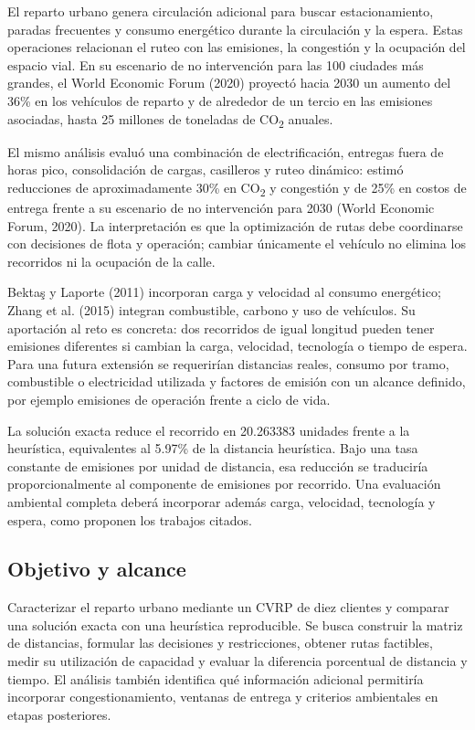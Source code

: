 \documentclass[11pt,a4paper]{article}
\numberwithin{equation}{section}
\begin{document}
El reparto urbano genera circulación adicional para buscar estacionamiento, paradas frecuentes y consumo energético durante la circulación y la espera. Estas operaciones relacionan el ruteo con las emisiones, la congestión y la ocupación del espacio vial. En su escenario de no intervención para las 100 ciudades más grandes, el World Economic Forum (2020) proyectó hacia 2030 un aumento del 36\% en los vehículos de reparto y de alrededor de un tercio en las emisiones asociadas, hasta 25 millones de toneladas de CO\textsubscript{2} anuales.


El mismo análisis evaluó una combinación de electrificación, entregas fuera de horas pico, consolidación de cargas, casilleros y ruteo dinámico: estimó reducciones de aproximadamente 30\% en CO\textsubscript{2} y congestión y de 25\% en costos de entrega frente a su escenario de no intervención para 2030 (World Economic Forum, 2020). La interpretación es que la optimización de rutas debe coordinarse con decisiones de flota y operación; cambiar únicamente el vehículo no elimina los recorridos ni la ocupación de la calle.


Bekta\c{s} y Laporte (2011) incorporan carga y velocidad al consumo energético; Zhang et al. (2015) integran combustible, carbono y uso de vehículos. Su aportación al reto es concreta: dos recorridos de igual longitud pueden tener emisiones diferentes si cambian la carga, velocidad, tecnología o tiempo de espera. Para una futura extensión se requerirían distancias reales, consumo por tramo, combustible o electricidad utilizada y factores de emisión con un alcance definido, por ejemplo emisiones de operación frente a ciclo de vida.


La solución exacta reduce el recorrido en 20.263383 unidades frente a la heurística, equivalentes al 5.97\% de la distancia heurística. Bajo una tasa constante de emisiones por unidad de distancia, esa reducción se traduciría proporcionalmente al componente de emisiones por recorrido. Una evaluación ambiental completa deberá incorporar además carga, velocidad, tecnología y espera, como proponen los trabajos citados.


\Needspace{110pt}

\subsection{Objetivo y alcance}

Caracterizar el reparto urbano mediante un CVRP de diez clientes y comparar una solución exacta con una heurística reproducible. Se busca construir la matriz de distancias, formular las decisiones y restricciones, obtener rutas factibles, medir su utilización de capacidad y evaluar la diferencia porcentual de distancia y tiempo. El análisis también identifica qué información adicional permitiría incorporar congestionamiento, ventanas de entrega y criterios ambientales en etapas posteriores.
\end{document}
